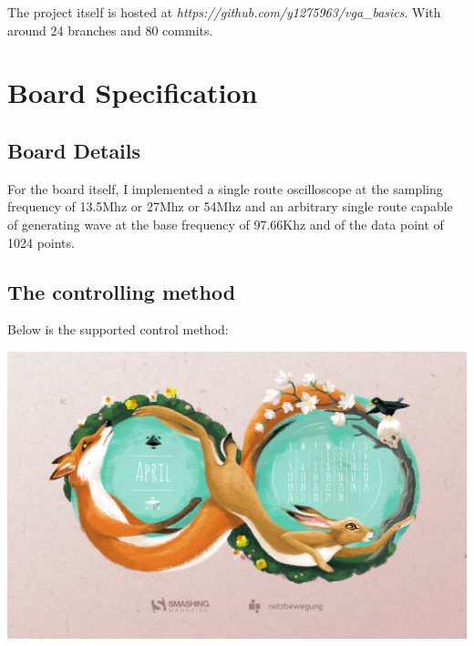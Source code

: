 \documentclass[11pt]{scrartcl}
\begin{document}
The project itself is hosted at \textit{https://github.com/y1275963/vga\_basics}. With around 24 branches and 80 commits.\\


\section{Board Specification}
\subsection{Board Details}
For the board itself, I implemented a single route oscilloscope at the sampling frequency of 13.5Mhz or 27Mhz or 54Mhz and an arbitrary single route capable of generating wave at the base frequency of 97.66Khz and of the data point of 1024 points.%
\subsection{The controlling method}

Below is the supported control method:

\begin{center}     
\begin{minipage}[t]{\linewidth}

{
\includegraphics[scale = 0.1]{apr.jpg}
}
\end{minipage}
\medskip
\end{center}
\end{document}
